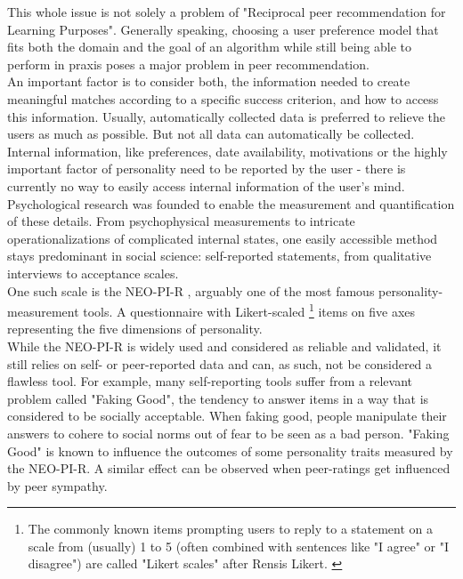 \documentclass[conference]{IEEEtran}
\begin{document}
This whole issue is not solely a problem of "Reciprocal peer recommendation for Learning Purposes".
Generally speaking, choosing a user preference model that fits both the domain and the goal of an algorithm while still being able to perform in praxis poses a major problem in peer recommendation. \cite{potts2018reciprocal, olakanmi2017group}\\
An important factor is to consider both, the information needed to create meaningful matches according to a specific success criterion, and how to access this information. Usually, automatically collected data is preferred to relieve the users as much as possible. But not all data can automatically be collected. Internal information, like preferences, date availability, motivations or the highly important factor of personality need to be reported by the user - there is currently no way to easily access internal information of the user's mind.\\
Psychological research was founded to enable the measurement and quantification of these details. From psychophysical measurements to intricate operationalizations of complicated internal states, one easily accessible method stays predominant in social science: self-reported statements, from qualitative interviews to acceptance scales.\\
One such scale is the NEO-PI-R \cite{ostendorf2004neo}, arguably one of the most famous personality-measurement tools. A questionnaire with Likert-scaled \footnote{The commonly known items prompting users to reply to a statement on a scale from (usually) 1 to 5 (often combined with sentences like "I agree" or "I disagree") are called "Likert scales" after Rensis Likert. \cite{likert1932technique}} items on five axes representing the five dimensions of personality. \cite{mccrae1987validation, goldberg1990alternative}\\
While the NEO-PI-R is widely used and considered as reliable and validated, it still relies on self- or peer-reported data and can, as such, not be considered a flawless tool. For example, many self-reporting tools suffer from a relevant problem called "Faking Good", the tendency to answer items in a way that is considered to be socially acceptable. When faking good, people manipulate their answers to cohere to social norms out of fear to be seen as a bad person. "Faking Good" is known to influence the outcomes of some personality traits measured by the NEO-PI-R.\cite{griffin2004applicants} A similar effect can be observed when peer-ratings get influenced by peer sympathy. \cite{leising2010letter}\\
\end{document}
